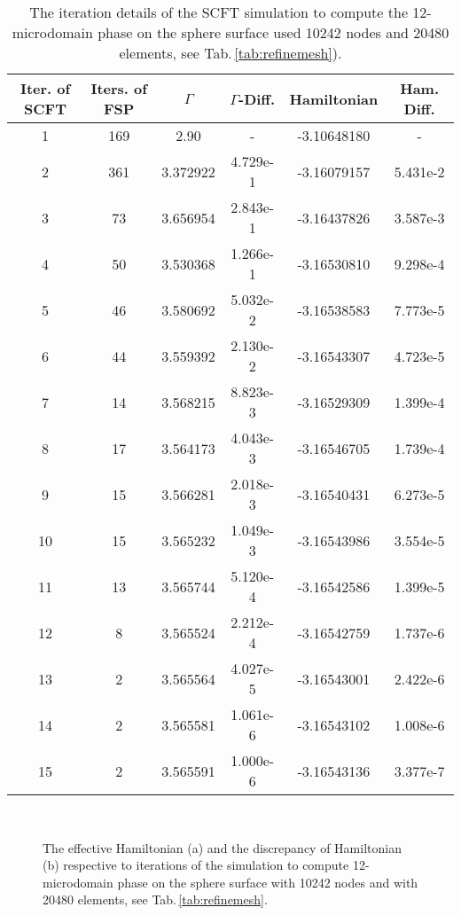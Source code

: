 \documentclass[final,1p,times]{elsarticle}
\begin{document}
\begin{table}[H]
  \caption{
  The iteration details of the SCFT simulation to compute the
  12-microdomain phase on the sphere surface used 
  10242 nodes and 20480 elements, see Tab.\,\ref{tab:refinemesh}).
  }
  \label{tab:fixedmesh}
  \centering
  \begin{tabular}{|c|c|c|c|c|c|}
    \hline
	Iter. of SCFT & Iters. of FSP & $\Gamma$  &
	$\Gamma$-Diff. & Hamiltonian & Ham. Diff.  \\
    \hline
	1 & 169 & 2.90 & - & -3.10648180 & -
	\\ \hline
	2 & 361 & 3.372922 & 4.729e-1 & -3.16079157  & 5.431e-2
	\\ \hline
	3 & 73 & 3.656954 & 2.843e-1  & -3.16437826  & 3.587e-3
	\\ \hline
	4 & 50 & 3.530368 & 1.266e-1  & -3.16530810  & 9.298e-4
	\\ \hline
	5 & 46 & 3.580692 & 5.032e-2  & -3.16538583  & 7.773e-5
	\\ \hline
	6 & 44 & 3.559392 & 2.130e-2  & -3.16543307  & 4.723e-5
	\\ \hline
	7 & 14 & 3.568215 & 8.823e-3  & -3.16529309  & 1.399e-4
	\\ \hline
	8 & 17 & 3.564173 & 4.043e-3  & -3.16546705  & 1.739e-4 
	\\ \hline
	9 & 15 & 3.566281 & 2.018e-3  & -3.16540431  & 6.273e-5
	\\ \hline
    10 & 15 & 3.565232 &1.049e-3  & -3.16543986  & 3.554e-5 
	\\ \hline
    11 & 13 & 3.565744 &5.120e-4  &  -3.16542586 & 1.399e-5
	\\ \hline
	12 & 8 & 3.565524 & 2.212e-4  & -3.16542759  & 1.737e-6 
	\\ \hline
    13 & 2 & 3.565564 & 4.027e-5  &  -3.16543001 & 2.422e-6 
	\\ \hline
    14 & 2 & 3.565581 & 1.061e-6  & -3.16543102  & 1.008e-6
    \\\hline
    15 & 2 & 3.565591 & 1.000e-6  & -3.16543136  & 3.377e-7
    \\ \hline    
  \end{tabular}
\end{table}

\begin{figure}[H]
\setlength{\captionmargin}{2pt}
\centering
    \hspace{0.0cm}
\    
\caption{
        The effective Hamiltonian (a) and the discrepancy of Hamiltonian (b)
        respective to iterations of the simulation to  compute 12-microdomain
        phase on the sphere surface with 10242 nodes and with 20480 elements,
        see Tab.\,\ref{tab:refinemesh}. 
}
		\label{fig:sphere-5}
\end{figure}
\end{document}
